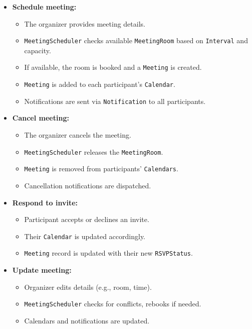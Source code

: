 \begin{itemize}
\item
\protect{}\label{AuYL5_C-CiAJyM-gz2AZM}
\textbf{Schedule meeting:}

\begin{itemize}
\item
The organizer provides meeting details.
\item
\texttt{MeetingScheduler} checks available \texttt{MeetingRoom} based on \texttt{Interval} and capacity.
\item
If available, the room is booked and a \texttt{Meeting} is created.
\item
\texttt{Meeting} is added to each participant's \texttt{Calendar}.
\item
Notifications are sent via \texttt{Notification} to all participants.
\end{itemize}
\item
\protect{}\label{l-GqCgGAoQdPphMx8TI2O}
\textbf{Cancel meeting:}

\begin{itemize}
\item
The organizer cancels the meeting.
\item
\texttt{MeetingScheduler} releases the \texttt{MeetingRoom}.
\item
\texttt{Meeting} is removed from participants' \texttt{Calendars}.
\item
Cancellation notifications are dispatched.
\end{itemize}
\item
\protect{}\label{6lzIXy7lMdpqycAbt_SFm}
\textbf{Respond to invite:}

\begin{itemize}
\item
Participant accepts or declines an invite.
\item
Their \texttt{Calendar} is updated accordingly.
\item
\texttt{Meeting} record is updated with their new \texttt{RSVPStatus}.
\end{itemize}
\item
\protect{}\label{RTDrj0VcO6x91fZ6rX29W}
\textbf{Update meeting:}

\begin{itemize}
\item
Organizer edits details (e.g., room, time).
\item
\texttt{MeetingScheduler} checks for conflicts, rebooks if needed.
\item
Calendars and notifications are updated.
\end{itemize}
\end{itemize}

